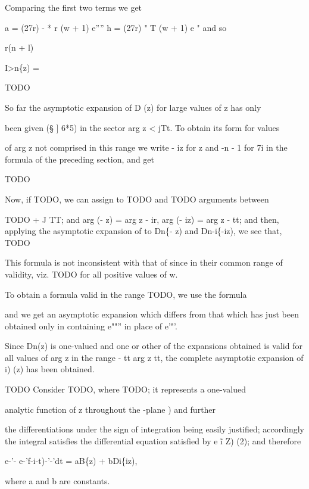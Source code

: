 Comparing the first two terms we get

a = (27r) - * r (w + 1) e'''' h = (27r) "  T (w + 1) e " and so

r(n + l)

I>n\{z) =

TODO

So far the
asymptotic expansion of D (z) for large values of z has only

been given (§ ] 6*5) in the sector arg z < jTt. To obtain its form for
values

of arg z not comprised in this range we write - iz for z and -n - 1
for 7i in the formula of the preceding section, and get

TODO

Now, if TODO, we can assign to TODO and TODO arguments between

TODO + J TT; and arg (- z) = arg z - ir, arg (- iz) = arg z - tt;
and then, applying the asymptotic expansion of to Dn\{- z) and
Dn-i\{-iz), we see that, TODO

%
%

This formula is not inconsistent with that of since in their
common range of validity, viz. TODO for all positive values of w.

To obtain a formula valid in the range TODO, we use the formula

and we get an asymptotic expansion which differs from that which has
just been obtained only in containing e""'' in place of e'"'.

Since Dn(z) is one-valued and one or other of the expansions obtained
is valid for all values of arg z in the range - tt  arg z tt, the
complete asymptotic expansion of i) (z) has been obtained.


TODO Consider TODO, where TODO; it represents a one-valued

analytic function of z throughout the -plane ) and further

the differentiations under the sign of integration being easily
justified; accordingly the integral satisfies the differential
equation satisfied by e \~ i Z) (2); and therefore

e-'- e-'f-i-t)-'-'dt = aB\{z) + bDi\{iz),

where a and b are constants.

